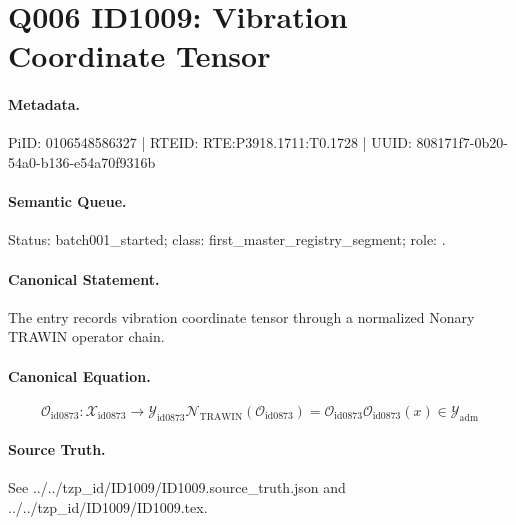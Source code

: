 \section*{Q006 ID1009: Vibration Coordinate Tensor}
\paragraph{Metadata.}
PiID: 0106548586327 | RTEID: RTE:P3918.1711:T0.1728 | UUID: 808171f7-0b20-54a0-b136-e54a70f9316b

\paragraph{Semantic Queue.}
Status: batch001\_started; class: first\_master\_registry\_segment; role: .

\paragraph{Canonical Statement.}
The entry records vibration coordinate tensor through a normalized Nonary TRAWIN operator chain.

\paragraph{Canonical Equation.}
\[
\mathcal{O}_{\mathrm{id0873}}:\mathcal{X}_{\mathrm{id0873}}\longrightarrow\mathcal{Y}_{\mathrm{id0873}} \mathcal{N}_{\mathrm{TRAWIN}}(\mathcal{O}_{\mathrm{id0873}})=\mathcal{O}_{\mathrm{id0873}} \mathcal{O}_{\mathrm{id0873}}(x)\in\mathcal{Y}_{\mathrm{adm}}
\]

\paragraph{Source Truth.}
See ../../tzp\_id/ID1009/ID1009.source\_truth.json and ../../tzp\_id/ID1009/ID1009.tex.
